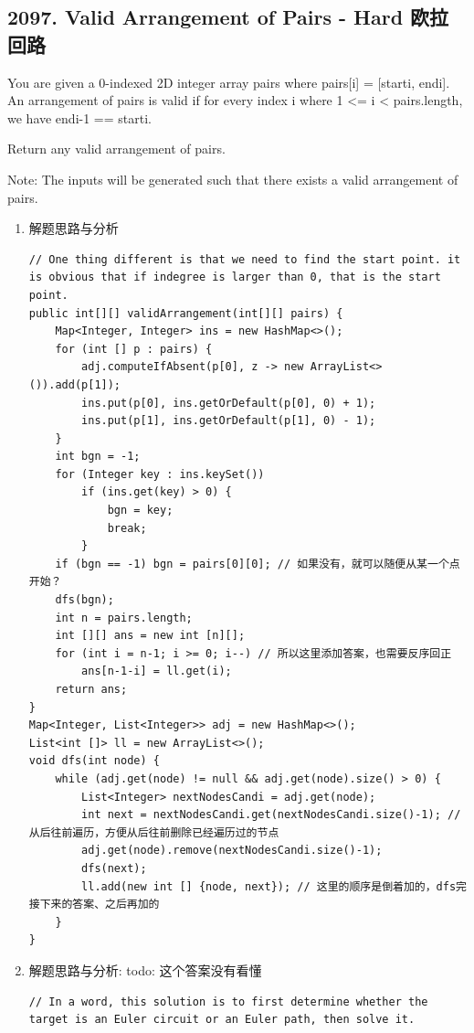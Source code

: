 \documentclass[9pt, b5paaper]{book}
\begin{document}
\subsection{2097. Valid Arrangement of Pairs - Hard 欧拉回路}
\label{sec-1-5-3}
You are given a 0-indexed 2D integer array pairs where pairs[i] = [starti, endi]. An arrangement of pairs is valid if for every index i where 1 <= i < pairs.length, we have endi-1 == starti.

Return any valid arrangement of pairs.

Note: The inputs will be generated such that there exists a valid arrangement of pairs.
\begin{enumerate}
\item 解题思路与分析
\label{sec-1-5-3-1}
\begin{verbatim}
// One thing different is that we need to find the start point. it is obvious that if indegree is larger than 0, that is the start point.
public int[][] validArrangement(int[][] pairs) { 
    Map<Integer, Integer> ins = new HashMap<>();
    for (int [] p : pairs) {
        adj.computeIfAbsent(p[0], z -> new ArrayList<>()).add(p[1]);
        ins.put(p[0], ins.getOrDefault(p[0], 0) + 1);
        ins.put(p[1], ins.getOrDefault(p[1], 0) - 1);
    }
    int bgn = -1;
    for (Integer key : ins.keySet()) 
        if (ins.get(key) > 0) {
            bgn = key;
            break;
        }
    if (bgn == -1) bgn = pairs[0][0]; // 如果没有，就可以随便从某一个点开始？
    dfs(bgn);
    int n = pairs.length;
    int [][] ans = new int [n][];
    for (int i = n-1; i >= 0; i--) // 所以这里添加答案，也需要反序回正
        ans[n-1-i] = ll.get(i);
    return ans;
}
Map<Integer, List<Integer>> adj = new HashMap<>();
List<int []> ll = new ArrayList<>();
void dfs(int node) {
    while (adj.get(node) != null && adj.get(node).size() > 0) {
        List<Integer> nextNodesCandi = adj.get(node);
        int next = nextNodesCandi.get(nextNodesCandi.size()-1); // 从后往前遍历，方便从后往前删除已经遍历过的节点
        adj.get(node).remove(nextNodesCandi.size()-1);
        dfs(next);
        ll.add(new int [] {node, next}); // 这里的顺序是倒着加的，dfs完接下来的答案、之后再加的
    }
}
\end{verbatim}
\item 解题思路与分析: todo: 这个答案没有看懂
\label{sec-1-5-3-2}
\begin{verbatim}
// In a word, this solution is to first determine whether the target is an Euler circuit or an Euler path, then solve it.

\end{verbatim}
\end{enumerate}
\end{document}
